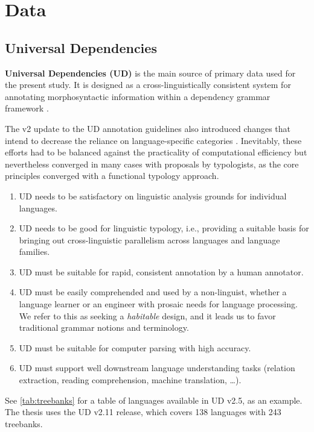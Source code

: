 \chapter{Data}\label{chapter:data}

\section{Universal Dependencies}\label{sec:data_ud}

\textbf{Universal Dependencies (UD)} is the main source of primary data used for the present study. It is designed as a cross-linguistically consistent system for annotating morphosyntactic information within a dependency grammar framework \citep{demarneffe2021}. 

The v2 update to the UD annotation guidelines also introduced changes that intend to decrease the reliance on language-specific categories \citep{nivre2020}. Inevitably, these efforts had to be balanced against the practicality of computational efficiency but nevertheless converged in many cases with proposals by typologists, as the core principles converged with a functional typology approach. \citet{croft2017}

\begin{enumerate}
    \item UD needs to be satisfactory on linguistic analysis grounds for individual languages.
    \item UD needs to be good for linguistic typology, i.e., providing a suitable basis for bringing out cross-linguistic parallelism across languages and language families.
    \item UD must be suitable for rapid, consistent annotation by a human annotator.
    \item UD must be easily comprehended and used by a non-linguist, whether a language learner or an engineer with prosaic needs for language processing. We refer to this as seeking a \textit{habitable} design, and it leads us to favor traditional grammar notions and terminology.
    \item UD must be suitable for computer parsing with high accuracy.
    \item UD must support well downstream language understanding tasks (relation extraction, reading comprehension, machine translation, \dots).
\end{enumerate}

See \ref{tab:treebanks} for a table of languages available in UD v2.5, as an example. The thesis uses the UD v2.11 release, which covers 138 languages with 243 treebanks.

